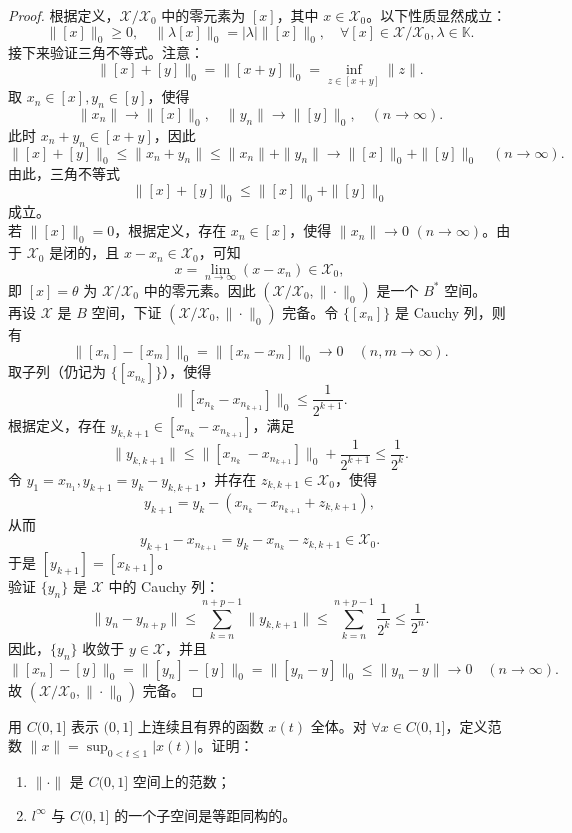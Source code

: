 \documentclass[lang=cn,newtx,10pt,scheme=chinese,thmcnt=chapter]{elegantbook}
\begin{document}
\begin{proof}
根据定义，$\mathscr{X} / \mathscr{X}_0$ 中的零元素为 $[x]$，其中 $x \in \mathscr{X}_0$。以下性质显然成立：
\[
\|[x]\|_0 \geqslant 0, \quad \|\lambda [x]\|_0 = |\lambda| \|[x]\|_0, \quad \forall [x] \in \mathscr{X} / \mathscr{X}_0, \lambda \in \mathbb{K}.
\]
接下来验证三角不等式。注意：
\[
\|[x] + [y]\|_0 = \|[x + y]\|_0 = \inf_{z \in [x + y]} \|z\|.
\]
取 $x_n \in [x], y_n \in [y]$，使得
\[
\|x_n\| \to \|[x]\|_0, \quad \|y_n\| \to \|[y]\|_0, \quad (n \to \infty).
\]
此时 $x_n + y_n \in [x + y]$，因此
\[
\|[x] + [y]\|_0 \leqslant \|x_n + y_n\| \leqslant \|x_n\| + \|y_n\| \to \|[x]\|_0 + \|[y]\|_0 \quad (n \to \infty).
\]
由此，三角不等式
\[
\|[x] + [y]\|_0 \leqslant \|[x]\|_0 + \|[y]\|_0
\]
成立。\\
若 $\|[x]\|_0 = 0$，根据定义，存在 $x_n \in [x]$，使得 $\|x_n\| \to 0$ $(n \to \infty)$。由于 $\mathscr{X}_0$ 是闭的，且 $x - x_n \in \mathscr{X}_0$，可知
\[
x = \lim_{n \to \infty} (x - x_n) \in \mathscr{X}_0,
\]
即 $[x] = \theta$ 为 $\mathscr{X} / \mathscr{X}_0$ 中的零元素。因此 $\left(\mathscr{X} / \mathscr{X}_0, \|\cdot\|_0\right)$ 是一个 $B^*$ 空间。\\
再设 $\mathscr{X}$ 是 $B$ 空间，下证 $\left(\mathscr{X} / \mathscr{X}_0, \|\cdot\|_0\right)$ 完备。令 $\{\left[x_n\right]\}$ 是 Cauchy 列，则有
\[
\|\left[x_n\right] - \left[x_m\right]\|_0 = \|[x_n - x_m]\|_0 \to 0 \quad (n, m \to \infty).
\]
取子列（仍记为 $\{\left[x_{n_k}\right]\}$），使得
\[
\|[x_{n_k} - x_{n_{k+1}}]\|_0 \leqslant \frac{1}{2^{k+1}}.
\]
根据定义，存在 $y_{k, k+1} \in [x_{n_k} - x_{n_{k+1}}]$，满足
\[
\|y_{k, k+1}\| \leqslant \|[x_{n_k}\ - x_{n_{k+1}}]\|_0 + \frac{1}{2^{k+1}} \leqslant \frac{1}{2^k}.
\]
令 $y_1 = x_{n_1}, y_{k+1} = y_k - y_{k, k+1}$，并存在 $z_{k, k+1} \in \mathscr{X}_0$，使得
\[
y_{k+1} = y_k - (x_{n_k} - x_{n_{k+1}} + z_{k, k+1}),
\]
从而
\[
y_{k+1} - x_{n_{k+1}} = y_k - x_{n_k} - z_{k, k+1} \in \mathscr{X}_0.
\]
于是 $\left[y_{k+1}\right] = \left[x_{k+1}\right]$。\\
验证 $\{y_n\}$ 是 $\mathscr{X}$ 中的 Cauchy 列：
\[
\|y_n - y_{n+p}\| \leqslant \sum_{k=n}^{n+p-1} \|y_{k, k+1}\| \leqslant \sum_{k=n}^{n+p-1} \frac{1}{2^k} \leqslant \frac{1}{2^n}.
\]
因此，$\{y_n\}$ 收敛于 $y \in \mathscr{X}$，并且
\[
\|[x_n] - [y]\|_0 = \|[y_n] - [y]\|_0 = \|[y_n - y]\|_0 \leqslant \|y_n - y\| \to 0 \quad (n \to \infty).
\]
故 $\left(\mathscr{X} / \mathscr{X}_0, \|\cdot\|_0\right)$ 完备。
\end{proof}
\begin{example}
用 $C(0,1]$ 表示 $(0,1]$ 上连续且有界的函数 $x(t)$ 全体。对 $\forall x \in C(0,1]$，定义范数 $\|x\| = \sup_{0 < t \leqslant 1} |x(t)|$。证明：
\begin{enumerate}
    \item $\|\cdot\|$ 是 $C(0,1]$ 空间上的范数；
    \item $l^\infty$ 与 $C(0,1]$ 的一个子空间是等距同构的。
\end{enumerate}
\end{example}
\end{document}
